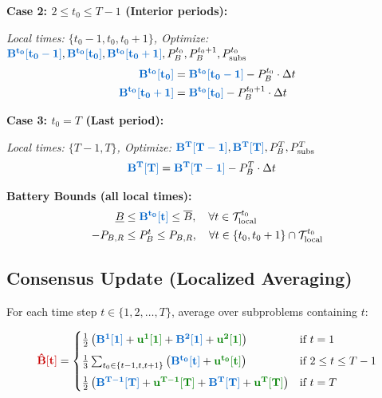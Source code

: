 \documentclass[11pt]{article}
\newcommand{\blueB}[1]{\textcolor{bluevar}{\mathbf{#1}}}      %
\newcommand{\redBhat}[1]{\textcolor{redvar}{\mathbf{#1}}}     %
\newcommand{\greenu}[1]{\textcolor{greenvar}{\mathbf{#1}}}    %
\begin{document}
\noindent\textbf{Case 2: $2 \leq t_0 \leq T-1$ (Interior periods):}

\textit{Local times: $\{t_0-1, t_0, t_0+1\}$, Optimize: $\blueB{B^{t_0}[t_0-1]}, \blueB{B^{t_0}[t_0]}, \blueB{B^{t_0}[t_0+1]}, P_B^{t_0}, P_B^{t_0+1}, P_{\text{subs}}^{t_0}$}
\begin{align}
\blueB{B^{t_0}[t_0]} &= \blueB{B^{t_0}[t_0-1]} - P_B^{t_0} \cdot \Delta t \\
\blueB{B^{t_0}[t_0+1]} &= \blueB{B^{t_0}[t_0]} - P_B^{t_0+1} \cdot \Delta t
\end{align}

\noindent\textbf{Case 3: $t_0 = T$ (Last period):}

\textit{Local times: $\{T-1, T\}$, Optimize: $\blueB{B^{T}[T-1]}, \blueB{B^{T}[T]}, P_B^T, P_{\text{subs}}^T$}
\begin{align}
\blueB{B^{T}[T]} &= \blueB{B^{T}[T-1]} - P_B^T \cdot \Delta t
\end{align}

\textbf{Battery Bounds (all local times):}
\begin{align}
\underline{B} &\leq \blueB{B^{t_0}[t]} \leq \overline{B}, \quad \forall t \in \mathcal{T}_{\text{local}}^{t_0} \\
-P_{B,R} &\leq P_B^t \leq P_{B,R}, \quad \forall t \in \{t_0, t_0+1\} \cap \mathcal{T}_{\text{local}}^{t_0}
\end{align}

\subsection{Consensus Update (Localized Averaging)}

For each time step $t \in \{1, 2, \ldots, T\}$, average over subproblems containing $t$:

\begin{align}
\redBhat{\hat{B}[t]} = \begin{cases}
\frac{1}{2} \left( \blueB{B^{1}[1]} + \greenu{u^{1}[1]} + \blueB{B^{2}[1]} + \greenu{u^{2}[1]} \right) & \text{if } t = 1 \\[0.5em]
\frac{1}{3} \sum_{t_0 \in \{t-1, t, t+1\}} \left( \blueB{B^{t_0}[t]} + \greenu{u^{t_0}[t]} \right) & \text{if } 2 \leq t \leq T-1 \\[0.5em]
\frac{1}{2} \left( \blueB{B^{T-1}[T]} + \greenu{u^{T-1}[T]} + \blueB{B^{T}[T]} + \greenu{u^{T}[T]} \right) & \text{if } t = T
\end{cases}
\end{align}
\end{document}
